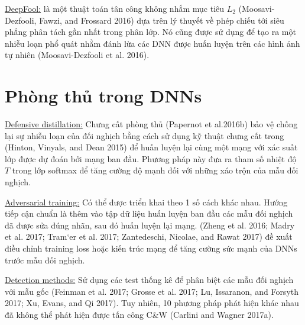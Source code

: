 \underline{DeepFool:} là một thuật toán tân công không nhắm mục tiêu $L_2$ (Moosavi-Dezfooli, 
Fawzi, and Frossard 2016) dựa trên lý thuyết về phép chiếu tới siêu phẳng phân tách gần nhất
trong phân lớp. Nó cũng được sử dụng để tạo ra một nhiễu loạn phổ quát nhằm đánh lừa 
các DNN được huấn luyện trên các hình ảnh tự nhiên (Moosavi-Dezfooli et al. 2016).

\section{Phòng thủ trong DNNs}
\underline{Defensive distillation:} Chưng cất phòng thủ (Papernot et al.2016b) bảo vệ 
chống lại sự nhiễu loạn của đối nghịch bằng cách sử dụng kỹ thuật chưng cất trong (Hinton, 
Vinyals, and Dean 2015) để huấn luyện lại cùng một mạng với xác suất lớp được dự đoán bởi 
mạng ban đầu. Phương pháp này đưa ra tham số nhiệt độ $T$ trong lớp softmax để tăng cường 
độ mạnh đối với những xáo trộn của mẫu đối nghịch.

\underline{Adversarial training:} Có thể được triển khai theo 1 số cách khác nhau. 
Hướng tiếp cận chuẩn là thêm vào tập dữ liệu huấn luyện ban đầu các mẫu đối nghịch đã được 
sửa đúng nhãn, sau đó huấn luyện lại mạng. (Zheng et al. 2016; Madry et al. 2017; 
Tram`er et al. 2017; Zantedeschi, Nicolae, and Rawat 2017) đề xuất điều chỉnh training 
loss hoặc kiến trúc mạng để tăng cường sức mạnh của DNNs trước mẫu đối nghịch.

\underline{Detection methods:} Sử dụng các test thống kê để phân biệt các mẫu đối nghịch 
với mẫu gốc (Feinman et al. 2017; Grosse et al. 2017; Lu, Issaranon, and Forsyth 2017; 
Xu, Evans, and Qi 2017). Tuy nhiên, 10 phương pháp phát hiện khác nhau đã không thể phát 
hiện được tấn công C\&W (Carlini and Wagner 2017a).
